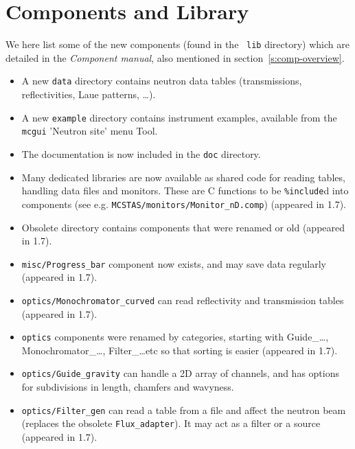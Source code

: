 \section{Components and Library} 
\label{s:new-features:components}
 
  
  We here list some of the new components (found in the \MCS\ \verb+lib+ directory) 
which are detailed in the {\it Component manual}, also mentioned in
section~\ref{s:comp-overview}.
  
\begin{itemize}
\item A new \verb+data+ directory contains neutron data tables (transmissions, reflectivities, Laue patterns, \ldots).
\item A new \verb+example+ directory contains instrument examples, available from the \verb+mcgui+ 'Neutron site' menu Tool.
\item The documentation is now included in the \verb+doc+ directory.
\item Many dedicated libraries are now available as shared code for reading tables,
    handling data files and monitors. These are C functions to be \texttt{\%include}d
    into components (see e.g. \verb+MCSTAS/monitors/Monitor_nD.comp+) (appeared in 1.7).
\item Obsolete directory contains components that were renamed or old (appeared in 1.7).
\item \verb+misc/Progress_bar+ component now exists, and may save data regularly 
      (appeared in 1.7).
\item \verb+optics/Monochromator_curved+ can read reflectivity and transmission tables
      (appeared in 1.7).
\item \verb+optics+ components were renamed by categories, starting with
   Guide\_\ldots, Monochromator\_\ldots, Filter\_\ldots etc so that sorting is
   easier (appeared in 1.7). 
\item \verb+optics/Guide_gravity+ can handle a 2D array of channels, and
    has options for subdivisions in length, chamfers and wavyness.
\item \verb+optics/Filter_gen+ can read a table from a file and affect the neutron
    beam (replaces the obsolete \verb+Flux_adapter+). It may act as a filter or a
    source (appeared in 1.7).

\end{itemize}
